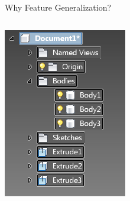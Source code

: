 \begin{frame}{Why Feature Generalization?}
\begin{columns}[T]
	\includegraphics[width=0.8\linewidth]{../Common/images/InventorFeatures}

\end{columns}



\end{frame}


